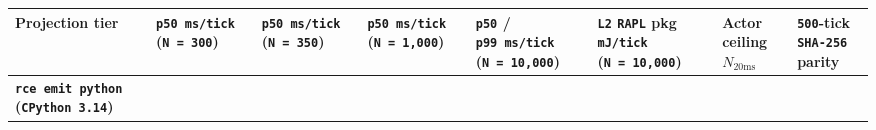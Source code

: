 \documentclass[10pt,letterpaper]{article}
\begin{document}
{\scriptsize\setlength{\tabcolsep}{2.4pt}\renewcommand{\arraystretch}{1.12}
\begin{longtable}[]{@{}
  >{\raggedright\arraybackslash}p{}
  >{\raggedleft\arraybackslash}p{}
  >{\raggedleft\arraybackslash}p{}
  >{\raggedleft\arraybackslash}p{}
  >{\raggedleft\arraybackslash}p{}
  >{\raggedleft\arraybackslash}p{}
  >{\raggedleft\arraybackslash}p{}
  >{\centering\arraybackslash}p{}@{}}
\toprule\noalign{}
\begin{minipage}[b]{\linewidth}\raggedright
\textbf{Projection tier}
\end{minipage} & \begin{minipage}[b]{\linewidth}\raggedleft
\textbf{\texttt{p50\ ms/\allowbreak{}tick} (\texttt{N\ =\ 300})}
\end{minipage} & \begin{minipage}[b]{\linewidth}\raggedleft
\textbf{\texttt{p50\ ms/\allowbreak{}tick} (\texttt{N\ =\ 350})}
\end{minipage} & \begin{minipage}[b]{\linewidth}\raggedleft
\textbf{\texttt{p50\ ms/\allowbreak{}tick} (\texttt{N\ =\ 1,\allowbreak{}000})}
\end{minipage} & \begin{minipage}[b]{\linewidth}\raggedleft
\textbf{\texttt{p50} / \texttt{p99\ ms/\allowbreak{}tick} (\texttt{N\ =\ 10,\allowbreak{}000})}
\end{minipage} & \begin{minipage}[b]{\linewidth}\raggedleft
\textbf{\texttt{L2} \texttt{RAPL} pkg \texttt{mJ/tick}
(\texttt{N\ =\ 10,\allowbreak{}000})}
\end{minipage} & \begin{minipage}[b]{\linewidth}\raggedleft
\textbf{Actor ceiling \(N_{20\text{ms}}\)}
\end{minipage} & \begin{minipage}[b]{\linewidth}\centering
\textbf{\texttt{500}-tick \texttt{SHA-256} parity}
\end{minipage} \\
\midrule\noalign{}
\endhead
\bottomrule\noalign{}
\endlastfoot
\textbf{\texttt{rce\ emit\ python} (\texttt{CPython\ 3.\allowbreak{}14})} &

\end{longtable}}
\end{document}
